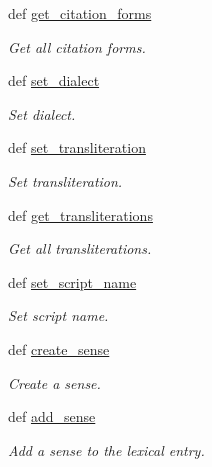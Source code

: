 \begin{DoxyCompactItemize}
def \hyperlink{classlmf_1_1src_1_1core_1_1lexical__entry_1_1_lexical_entry_a14304ddd9123093352bce750b8dce7c8}{get\+\_\+citation\+\_\+forms}
\begin{DoxyCompactList}\small\item\em Get all citation forms. \end{DoxyCompactList}\item 
def \hyperlink{classlmf_1_1src_1_1core_1_1lexical__entry_1_1_lexical_entry_aef2e9bae6caaa9cebcb1960869752037}{set\+\_\+dialect}
\begin{DoxyCompactList}\small\item\em Set dialect. \end{DoxyCompactList}\item 
def \hyperlink{classlmf_1_1src_1_1core_1_1lexical__entry_1_1_lexical_entry_a7aab11889a7b3ec80087cce8e4ed28e0}{set\+\_\+transliteration}
\begin{DoxyCompactList}\small\item\em Set transliteration. \end{DoxyCompactList}\item 
def \hyperlink{classlmf_1_1src_1_1core_1_1lexical__entry_1_1_lexical_entry_a24bb03c658cff21a7b34d30e720f1da5}{get\+\_\+transliterations}
\begin{DoxyCompactList}\small\item\em Get all transliterations. \end{DoxyCompactList}\item 
def \hyperlink{classlmf_1_1src_1_1core_1_1lexical__entry_1_1_lexical_entry_a254dd885319a2be995b81f659cacce88}{set\+\_\+script\+\_\+name}
\begin{DoxyCompactList}\small\item\em Set script name. \end{DoxyCompactList}\item 
def \hyperlink{classlmf_1_1src_1_1core_1_1lexical__entry_1_1_lexical_entry_a4ac0758b963893625a283a289b4c1549}{create\+\_\+sense}
\begin{DoxyCompactList}\small\item\em Create a sense. \end{DoxyCompactList}\item 
def \hyperlink{classlmf_1_1src_1_1core_1_1lexical__entry_1_1_lexical_entry_a4aef3989f5793f9ef330cbca51b77520}{add\+\_\+sense}
\begin{DoxyCompactList}\small\item\em Add a sense to the lexical entry. \end{DoxyCompactList}\item 

\end{DoxyCompactItemize}
